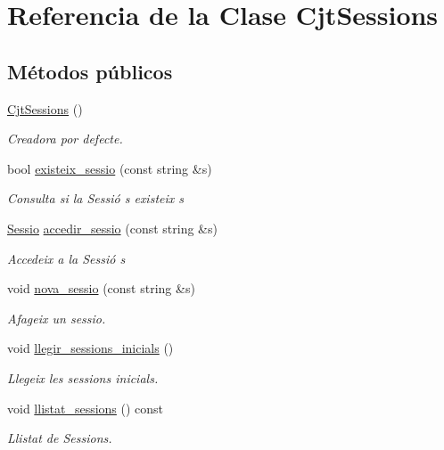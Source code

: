 \hypertarget{class_cjt_sessions}{}\section{Referencia de la Clase Cjt\+Sessions}
\label{class_cjt_sessions}
\subsection*{Métodos públicos}
\begin{DoxyCompactItemize}
\item 
\mbox{\hyperlink{class_cjt_sessions_acfe3023a40e3dcbfeb558466a013ca87}{Cjt\+Sessions}} ()
\begin{DoxyCompactList}\small\item\em Creadora por defecte. \end{DoxyCompactList}\item 
bool \mbox{\hyperlink{class_cjt_sessions_ae9df08981044710d4343da21c44e9f1b}{existeix\+\_\+sessio}} (const string \&s)
\begin{DoxyCompactList}\small\item\em Consulta si la Sessió s existeix {\itshape s} \end{DoxyCompactList}\item 
\mbox{\hyperlink{class_sessio}{Sessio}} \mbox{\hyperlink{class_cjt_sessions_a1b537e16d53208300ed8a659440b85cd}{accedir\+\_\+sessio}} (const string \&s)
\begin{DoxyCompactList}\small\item\em Accedeix a la Sessió {\itshape s} \end{DoxyCompactList}\item 
void \mbox{\hyperlink{class_cjt_sessions_ac6e00a3727d5ece89965a4f38d707273}{nova\+\_\+sessio}} (const string \&s)
\begin{DoxyCompactList}\small\item\em Afageix un sessio. \end{DoxyCompactList}\item 
void \mbox{\hyperlink{class_cjt_sessions_a4ea0fafab13c9db8fe385f62fb572fc0}{llegir\+\_\+sessions\+\_\+inicials}} ()
\begin{DoxyCompactList}\small\item\em Llegeix les sessions inicials. \end{DoxyCompactList}\item 
void \mbox{\hyperlink{class_cjt_sessions_a1e4f04be3e5da3d8f9091620d56ea355}{llistat\+\_\+sessions}} () const
\begin{DoxyCompactList}\small\item\em Llistat de Sessions. \end{DoxyCompactList}\end{DoxyCompactItemize}


